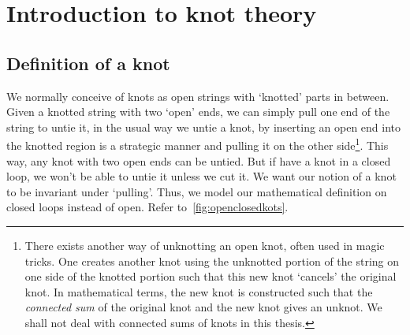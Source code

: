 \chapter{Introduction to knot theory}

\section{Definition of a knot}

We normally conceive of knots as open strings with `knotted' parts in between. Given a knotted string with two `open' ends, we can simply pull one end of the string to untie it, in the usual way we untie a knot, by inserting an open end into the knotted region is a strategic manner and pulling it on the other side\footnote{There exists another way of unknotting an open knot, often used in magic tricks. One creates another knot using the unknotted portion of the string on one side of the knotted portion such that this new knot `cancels' the original knot. In mathematical terms, the new knot is constructed such that the \textit{connected sum} of the original knot and the new knot gives an unknot. We shall not deal with connected sums of knots in this thesis.}. This way, any knot with two open ends can be untied. But if have a knot in a closed loop, we won't be able to untie it unless we cut it. We want our notion of a knot to be invariant under `pulling'. Thus, we model our mathematical definition on closed loops instead of open. Refer to~\cref{fig:openclosedkots}.

